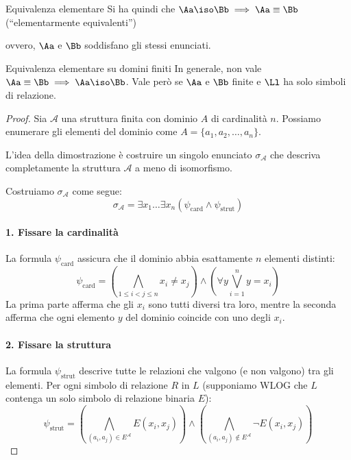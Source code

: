 \documentclass[a4paper,11pt]{report}
\begin{document}
\begin{corframe}{Equivalenza elementare}
    Si ha quindi che \( \Aa \iso \Bb \implies \Aa \equiv \Bb \) (``elementarmente equivalenti'')

    ovvero, \( \Aa \) e \( \Bb \) soddisfano gli stessi enunciati.

\end{corframe}

\begin{thmframe}{Equivalenza elementare su domini finiti}{}
    In generale, non vale \( \Aa \equiv \Bb \implies \Aa \iso \Bb \). Vale però se \( \Aa \) e \( \Bb \) finite e \( \Ll \) ha solo simboli di relazione.
\end{thmframe}


\begin{proof}
Sia \( \mathcal{A} \) una struttura finita con dominio \( A \) di cardinalità \( n \). Possiamo enumerare gli elementi del dominio come \( A = \{a_1, a_2, \dots, a_n\} \).

L'idea della dimostrazione è costruire un singolo enunciato \( \sigma_{\mathcal{A}} \) che descriva completamente la struttura \( \mathcal{A} \) a meno di isomorfismo.

Costruiamo \( \sigma_{\mathcal{A}} \) come segue:
\[
\sigma_{\mathcal{A}} = \exists x_1 \dots \exists x_n \left( \psi_{\text{card}} \land \psi_{\text{strut}} \right)
\]

\paragraph{1. Fissare la cardinalità}
La formula \( \psi_{\text{card}} \) assicura che il dominio abbia esattamente \( n \) elementi distinti:
\[
\psi_{\text{card}} = \left( \bigwedge_{1 \le i < j \le n} x_i \neq x_j \right) \land \left( \forall y \bigvee_{i=1}^n y = x_i \right)
\]
La prima parte afferma che gli \( x_i \) sono tutti diversi tra loro, mentre la seconda afferma che ogni elemento \( y \) del dominio coincide con uno degli \( x_i \).

\paragraph{2. Fissare la struttura}
La formula \( \psi_{\text{strut}} \) descrive tutte le relazioni che valgono (e non valgono) tra gli elementi. Per ogni simbolo di relazione \( R \) in \( L \) (supponiamo WLOG che \( L \) contenga un solo simbolo di relazione binaria \( E \)):
\[
\psi_{\text{strut}} = \left( \bigwedge_{(a_i, a_j) \in E^{\mathcal{A}}} E(x_i, x_j) \right) \land \left( \bigwedge_{(a_i, a_j) \notin E^{\mathcal{A}}} \neg E(x_i, x_j) \right)
\]


\end{proof}
\end{document}

